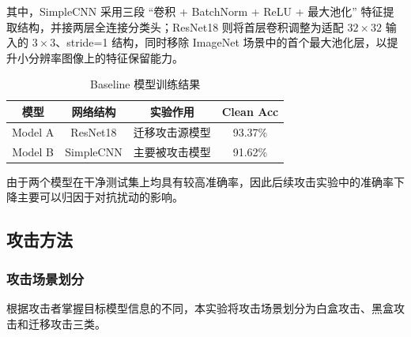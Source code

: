 \documentclass[UTF8,a4paper,12pt]{ctexart}
\begin{document}
其中，SimpleCNN 采用三段 ``卷积 + BatchNorm + ReLU + 最大池化'' 特征提取结构，并接两层全连接分类头；ResNet18 则将首层卷积调整为适配 $32 \times 32$ 输入的 $3 \times 3$、stride=1 结构，同时移除 ImageNet 场景中的首个最大池化层，以提升小分辨率图像上的特征保留能力。

\begin{table}[H]
    \centering
    \caption{Baseline 模型训练结果}
    \begin{tabular}{cccc}
        \toprule
        模型 & 网络结构 & 实验作用 & Clean Acc \\
        \midrule
        Model A & ResNet18 & 迁移攻击源模型 & 93.37\% \\
        Model B & SimpleCNN & 主要被攻击模型 & 91.62\% \\
        \bottomrule
    \end{tabular}
    \label{tab:baseline}
\end{table}

由于两个模型在干净测试集上均具有较高准确率，因此后续攻击实验中的准确率下降主要可以归因于对抗扰动的影响。

\subsection{攻击方法}

\subsubsection{攻击场景划分}

根据攻击者掌握目标模型信息的不同，本实验将攻击场景划分为白盒攻击、黑盒攻击和迁移攻击三类。

\begin{table}[H]
    \centering
    \caption{攻击场景划分}
    \label{tab:attack_scenarios}
\end{table}
\end{document}
